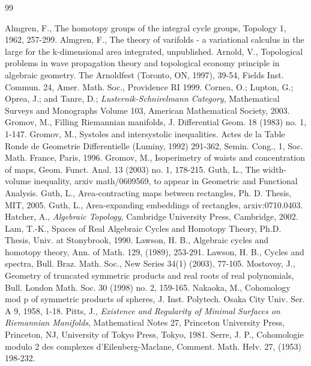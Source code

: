 \documentclass{amsart}
\newtheorem*{Theorem 1}{Theorem 1}
\newtheorem*{Theorem 2}{Theorem 2}
\newtheorem*{Theorem 1A}{Theorem 1A}
\newtheorem*{Theorem 2A}{Theorem 2A}
\newtheorem*{vanishing lemma}{Vanishing Lemma}
\numberwithin{equation}{section}
\begin{document}
\begin{thebibliography}{99}

 Almgren, F., The homotopy groups of the integral cycle groups, Topology 1, 1962, 257-299.
 Almgren, F., The theory of varifolds - a
variational calculus in the large for the k-dimensional area
integrated, unpublished.
 Arnold, V., Topological problems in wave propagation theory and topological economy principle in algebraic geometry.  The Arnoldfest (Toronto, ON, 1997), 39-54, Fields Inst. Commun. 24, Amer. Math. Soc., Providence RI 1999.
 Cornea, O.; Lupton, G.; Oprea, J.; and Tanre, D.;
{\it Lusternik-Schnirelmann Category}, Mathematical Surveys and
Monographs Volume 103, American Mathematical Society, 2003.
 Gromov, M., Filling Riemannian manifolds, J. Differential Geom. 18 (1983) no. 1, 1-147.
 Gromov, M., Systoles and intersystolic inequalities.  Actes de la Table Ronde de Geometrie Differentielle (Luminy, 1992) 291-362, Semin. Cong., 1, Soc. Math. France, Paris, 1996.
 Gromov, M., Isoperimetry of waists and concentration of maps, Geom. Funct. Anal. 13 (2003) no. 1, 178-215.
 Guth, L., The width-volume inequality, arxiv math/0609569, to appear in Geometric and Functional Analysis.
 Guth, L., Area-contracting maps between rectangles, Ph. D. Thesis, MIT, 2005.
 Guth, L., Area-expanding embeddings of rectangles, arxiv:0710.0403.
 Hatcher, A., {\it Algebraic Topology}, Cambridge University Press, Cambridge, 2002.
 Lam, T.-K., Spaces of Real Algebraic Cycles and Homotopy Theory, Ph.D. Thesis, Univ. at Stonybrook, 1990.
 Lawson, H. B., Algebraic cycles and homotopy theory, Ann. of Math. 129,
(1989), 253-291.
 Lawson, H. B., Cycles and spectra, Bull. Braz. Math. Soc., New Series 34(1) (2003), 77-105. 
 Mostovoy, J., Geometry of truncated symmetric
products and real roots of real polynomials, Bull. London Math. Soc. 30 (1998) no. 2, 159-165.
 Nakaoka, M., Cohomology mod p of symmetric products of spheres, J. Inst. Polytech. Osaka City Univ. Ser. A 9, 1958, 1-18.
 Pitts, J., {\it Existence and Regularity of Minimal Surfaces on Riemannian Manifolds}, Mathematical Notes 27, Princeton University Press, Princeton, NJ, University of Tokyo Press, Tokyo, 1981.
 Serre, J. P., Cohomologie modulo 2 des complexes 
d'Eilenberg-Maclane, Comment. Math. Helv. 27, (1953) 198-232.

\end{thebibliography}
\end{document}
